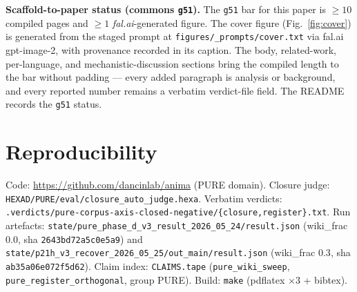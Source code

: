 \documentclass[11pt,a4paper]{article}
\begin{document}
\medskip
\noindent\textbf{Scaffold-to-paper status (commons \texttt{g51}).} The
\texttt{g51} bar for this paper is $\geq 10$ compiled pages and $\geq 1$
\emph{fal.ai}-generated figure. The cover figure
(Fig.~\ref{fig:cover}) is generated from the staged prompt at
\verb|figures/_prompts/cover.txt| via fal.ai gpt-image-2, with provenance
recorded in its caption. The body, related-work, per-language, and
mechanistic-discussion sections bring the compiled length to the bar
without padding --- every added paragraph is analysis or background, and
every reported number remains a verbatim verdict-file field. The README
records the \texttt{g51} status.

\section*{Reproducibility}

Code: \url{https://github.com/dancinlab/anima} (PURE domain). Closure
judge: \verb|HEXAD/PURE/eval/closure_auto_judge.hexa|. Verbatim verdicts:
\verb|.verdicts/pure-corpus-axis-closed-negative/{closure,register}.txt|.
Run artefacts: \verb|state/pure_phase_d_v3_result_2026_05_24/result.json|
(wiki\_frac $0.0$, sha \texttt{2643bd72a5c0e5a9}) and
\verb|state/p21h_v3_recover_2026_05_25/out_main/result.json| (wiki\_frac
$0.3$, sha \texttt{ab35a06e072f5d62}). Claim index:
\verb|CLAIMS.tape| \citep{anima2026claims}
(\texttt{pure\_wiki\_sweep}, \texttt{pure\_register\_orthogonal},
group PURE). Build: \texttt{make} (pdflatex $\times 3$ + bibtex).



\end{document}
